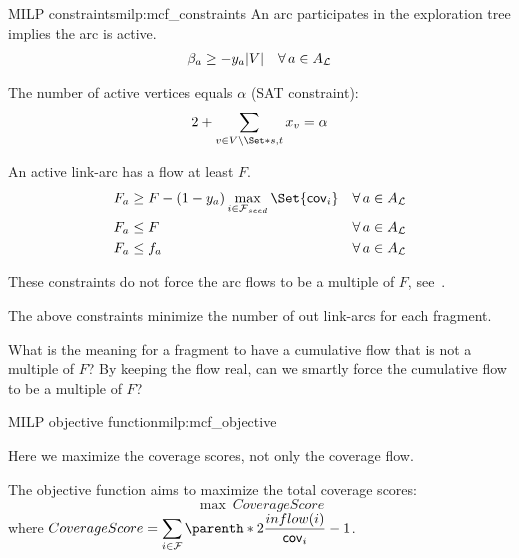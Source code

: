 \begin{definition}{\MCF{} MILP constraints}{milp:mcf_constraints}
  An arc participates in the exploration tree implies the arc is active.
  \begin{align}
    \beta_a \geq - y_a |V| \quad \forall a \in A_\Links{}
  \end{align}

  The number of active vertices equals \(\alpha{}\) (SAT constraint):
  \begin{align}
    2 + \sum_{v \in V \setminus \Set*{s, t}} x_v = \alpha
  \end{align}

  An active link-arc has a flow at least \(F\).
  \begin{align}
    F_a & \geq F - (1 - y_a) \max_{i \in \SeedFrags{}}\Set{\cov{i}} & \forall a \in A_\Links{} \\
    F_a & \leq F & \forall a \in A_\Links{} \\
    F_a & \leq f_a & \forall a \in A_\Links{} \label{const:arc_flow_at_least_total_flow}
  \end{align}
  \begin{infobox}
    These constraints do not force the arc flows to be a multiple of \(F\), see~.
  \end{infobox}
  \begin{missingproofbox}
    The above constraints minimize the number of out link-arcs for each fragment.
  \end{missingproofbox}
  \begin{questionbox}
    What is the meaning for a fragment to have a cumulative flow that is not a multiple of \(F\)?
    By keeping the flow real, can we smartly force the cumulative flow to be a multiple of \(F\)?
  \end{questionbox}
\end{definition}

\begin{definition}{\MCF{} MILP objective function}{milp:mcf_objective}
  \begin{newfeatbox}
    Here we maximize the coverage scores, not only the coverage flow.
  \end{newfeatbox}
  The objective function aims to maximize the total coverage scores:
  \begin{equation}
    \max ~ CoverageScore
  \end{equation}
  where \(
    \displaystyle CoverageScore = %
    \sum_{i \in \Fragments{}} \parenth*{2 \frac{inflow(i)}{\cov{i}} - 1}
  \).
\end{definition}